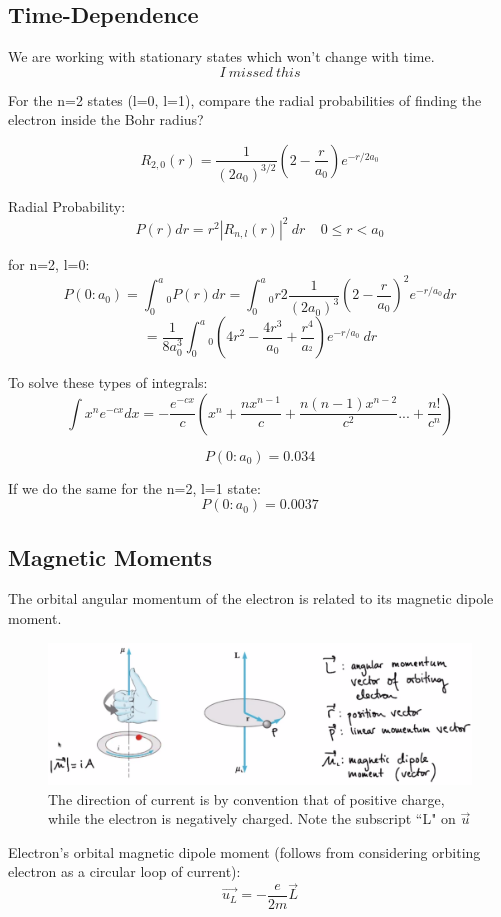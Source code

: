 \documentclass[class=article,crop=false]{standalone}
\begin{document}
\subsection{Time-Dependence}
We are working with stationary states which won't change with time.
$$ I\ missed\ this $$

\newpage
\begin{question}[Example]
	For the n=2 states (l=0, l=1), compare the radial probabilities of finding the electron inside the Bohr radius?

	$$ R_{2,0}(r) = \frac{1}{(2a_0)^{3/2}} \left(2 - \frac{r}{a_0} \right) e^{-r/2a_0} $$

	Radial Probability:
	$$ P(r) dr = r^2 |R_{n,l}(r)|^2\ dr \ \ \ \ \ 0 \leq r < a_0 $$

	for n=2, l=0:
	$$ P(0:a_0) = \int_0^a_0 P(r) dr = \int_0^a_0 r2 \frac{1}{(2a_0)^{3}} \left(2 - \frac{r}{a_0} \right)^2 e^{-r/a_0}  dr  $$
	$$ = \frac{1}{8a_0^3} \int_0^a_0 \left(4r^2 - \frac{4r^3}{a_0} + \frac{r^4}{a_^2} \right) e^{-r/a_0}\ dr $$

	To solve these types of integrals:
	$$ \int x^n e^{-cx} dx = - \frac{e^{-cx}}{c} \left( x^n + \frac{nx^{n-1}}{c} + \frac{n(n-1)x^{n-2}}{c^2} ... + \frac{n!}{c^n} \right) $$

	$$ P(0:a_0) = 0.034 $$

	If we do the same for the n=2, l=1 state:
	$$ P(0:a_0) = 0.0037 $$
\end{question}

\subsection{Magnetic Moments}
The orbital angular momentum of the electron is related to its magnetic dipole moment.
\begin{figure}[h!]
	\centering
	\includegraphics[width=1\linewidth]{./Images/magnetic_moment.png}
	\caption{The direction of current is by convention that of positive charge, while the electron is negatively charged. Note the subscript ``L" on $\vec{u}$}
\end{figure}
Electron's orbital magnetic dipole moment (follows from considering orbiting electron as a circular loop of current):
$$ \vec{u_L} = -\frac{e}{2m} \vec{L} $$
\end{document}
